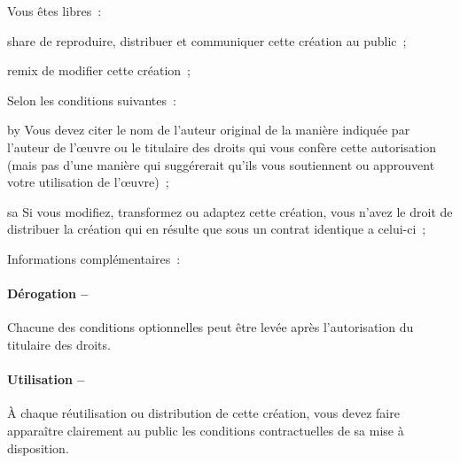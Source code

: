 {  %
  \begin{lblock}{Vous êtes libres~:}

    \begin{pictonote}{share}
      de reproduire, distribuer et communiquer cette création au
      public~;
    \end{pictonote}

    \begin{pictonote}{remix}
      de modifier cette création~;
    \end{pictonote}

  \end{lblock}
  \begin{lblock}{Selon les conditions suivantes~:}

    \begin{pictonote}{by}
       Vous devez citer le nom de l'auteur
      original de la manière indiquée par l'auteur de l'œuvre ou le
      titulaire des droits qui vous confère cette autorisation (mais pas
      d'une manière qui suggérerait qu'ils vous soutiennent ou
      approuvent votre utilisation de l'œuvre)~;
    \end{pictonote}

    \begin{pictonote}{sa}
       Si
      vous modifiez, transformez ou adaptez cette création, vous n'avez
      le droit de distribuer la création qui en résulte que sous un
      contrat identique a celui-ci~;
    \end{pictonote}

  \end{lblock}
  \begin{lblock}{Informations complémentaires~:}

    \hspace{0.4cm}
    \parbox{\textwidth-.8cm}{
      \paragraph{Dérogation --}
      Chacune des conditions optionnelles peut être levée après
      l'autorisation du titulaire des droits.

      \paragraph{Utilisation --}
      À chaque réutilisation ou distribution de cette création, vous
      devez faire apparaître clairement au public les conditions
      contractuelles de sa mise à disposition.

}
\end{lblock}}
